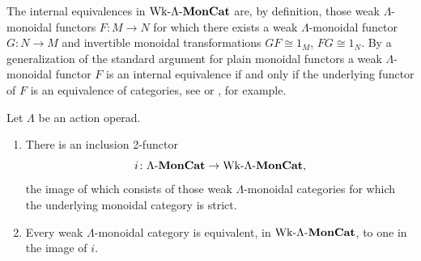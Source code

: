 \begin{rem}\label{rem:eq-in-wlmc}
The internal equivalences in $\textrm{Wk}\mbox{-}\Lambda\mbox{-}\mathbf{MonCat}$ are, by definition, those weak $\Lambda$-monoidal functors $F \colon M \to N$ for which there exists a weak $\Lambda$-monoidal functor $G \colon N \to M$ and invertible monoidal transformations $GF \cong 1_M$, $FG \cong 1_N$. By a generalization of the standard argument for plain monoidal functors a weak $\Lambda$-monoidal functor $F$ is an internal equivalence if and only if the underlying functor of $F$ is an equivalence of categories, see \cite[Proposition 3.4]{lcmv-psmonad} or \cite[Corollary 7.4.2]{jy-2dim}, for example.
\end{rem}


\begin{thm}\label{thm:wlmc-to-lmc}
Let $\Lambda$ be an action operad.
\begin{enumerate}
\item There is an inclusion 2-functor
\[
i \colon \Lambda\mbox{-}\mathbf{MonCat} \to \textrm{Wk}\mbox{-}\Lambda\mbox{-}\mathbf{MonCat},
\]
the image of which consists of those weak $\Lambda$-monoidal categories for which the underlying monoidal category is strict.
\item Every weak $\Lambda$-monoidal category is equivalent, in $\textrm{Wk}\mbox{-}\Lambda\mbox{-}\mathbf{MonCat}$, to one in the image of $i$.
\end{enumerate}
\end{thm}
